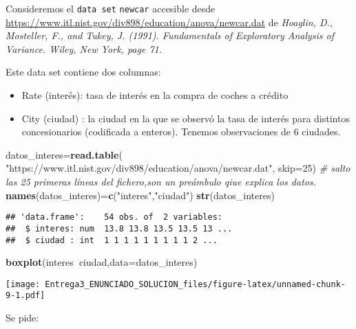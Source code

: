 \documentclass[
]{article}
\newenvironment{Shaded}{\begin{snugshade}}{\end{snugshade}}
\newcommand{\CommentTok}[1]{\textcolor[rgb]{0.56,0.35,0.01}{\textit{#1}}}
\newcommand{\DataTypeTok}[1]{\textcolor[rgb]{0.13,0.29,0.53}{#1}}
\newcommand{\DecValTok}[1]{\textcolor[rgb]{0.00,0.00,0.81}{#1}}
\newcommand{\KeywordTok}[1]{\textcolor[rgb]{0.13,0.29,0.53}{\textbf{#1}}}
\newcommand{\NormalTok}[1]{#1}
\newcommand{\OperatorTok}[1]{\textcolor[rgb]{0.81,0.36,0.00}{\textbf{#1}}}
\newcommand{\StringTok}[1]{\textcolor[rgb]{0.31,0.60,0.02}{#1}}
\providecommand{\tightlist}{%
  \setlength{\itemsep}{0pt}\setlength{\parskip}{0pt}}
\begin{document}
Consideremos el \texttt{data\ set} \texttt{newcar} accesible desde
\url{https://www.itl.nist.gov/div898/education/anova/newcar.dat} de
\emph{Hoaglin, D., Mosteller, F., and Tukey, J. (1991). Fundamentals of
Exploratory Analysis of Variance. Wiley, New York, page 71.}

Este data set contiene dos columnas:

\begin{itemize}
\tightlist
\item
  Rate (interés): tasa de interés en la compra de coches a crédito
\item
  City (ciudad) : la ciudad en la que se observó la tasa de interés para
  distintos concesionarios (codificada a enteros). Tenemos observaciones
  de 6 ciudades.
\end{itemize}

\begin{Shaded}
\begin{Highlighting}[]
\NormalTok{datos_interes=}\KeywordTok{read.table}\NormalTok{(}
  \StringTok{"https://www.itl.nist.gov/div898/education/anova/newcar.dat"}\NormalTok{,}
  \DataTypeTok{skip=}\DecValTok{25}\NormalTok{)}
\CommentTok{# salto las 25 primeras líneas del fichero,son un preámbulo qiue explica los datos.}
\KeywordTok{names}\NormalTok{(datos_interes)=}\KeywordTok{c}\NormalTok{(}\StringTok{"interes"}\NormalTok{,}\StringTok{"ciudad"}\NormalTok{)}
\KeywordTok{str}\NormalTok{(datos_interes)}
\end{Highlighting}
\end{Shaded}

\begin{verbatim}
## 'data.frame':    54 obs. of  2 variables:
##  $ interes: num  13.8 13.8 13.5 13.5 13 ...
##  $ ciudad : int  1 1 1 1 1 1 1 1 1 2 ...
\end{verbatim}

\begin{Shaded}
\begin{Highlighting}[]
\KeywordTok{boxplot}\NormalTok{(interes}\OperatorTok{~}\NormalTok{ciudad,}\DataTypeTok{data=}\NormalTok{datos_interes)}
\end{Highlighting}
\end{Shaded}

\texttt{[image: Entrega3\_ENUNCIADO\_SOLUCION\_files/figure-latex/unnamed-chunk-9-1.pdf]}

Se pide:
\end{document}
